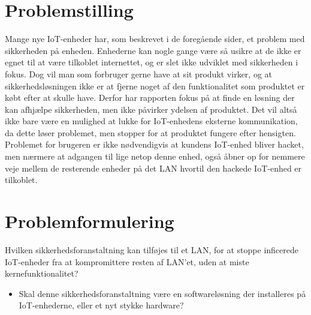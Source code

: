 \section{Problemstilling}


Mange nye IoT-enheder har, som beskrevet i de foregående sider, et problem med sikkerheden på enheden. Enhederne kan nogle gange være så usikre at de ikke er egnet til at være tilkoblet internettet, og er slet ikke udviklet med sikkerheden i fokus. Dog vil man som forbruger gerne have at sit produkt virker, og at sikkerhedsløsningen ikke er at fjerne noget af den funktionalitet som produktet er købt efter at skulle have. Derfor har rapporten fokus på at finde en løsning der kan afhjælpe sikkerheden, men ikke påvirker ydelsen af produktet. Det vil altså ikke bare være en mulighed at lukke for IoT-enhedens eksterne kommunikation, da dette løser problemet, men stopper for at produktet fungere efter hensigten.\\
Problemet for brugeren er ikke nødvendigvis at kundens IoT-enhed bliver hacket, men nærmere at adgangen til lige netop denne enhed, også åbner op for nemmere veje mellem de resterende enheder på det LAN hvortil den hackede IoT-enhed er tilkoblet.

\section{Problemformulering}



Hvilken sikkerhedsforanstaltning kan tilføjes til et LAN, for at stoppe inficerede IoT-enheder fra at kompromittere resten af LAN'et, uden at miste kernefunktionalitet?
\begin{itemize}
    \item Skal denne sikkerhedsforanstaltning være en softwareløsning der installeres på IoT-enhederne, eller et nyt stykke hardware?
\end{itemize}

